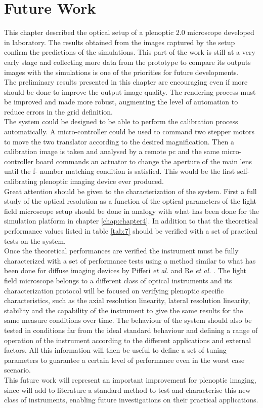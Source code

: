 \section{Future Work}
This chapter described the optical setup of a plenoptic 2.0 microscope developed in laboratory. The results obtained from the images captured by the setup confirm the predictions of the simulations. This part of the work is still at a very early stage and collecting more data from the prototype to compare its outputs images with the simulations is one of the priorities for future developments.\\
 The preliminary results presented in this chapter are encouraging even if more should be done to improve the output image quality. The rendering process must be improved and made more robust, augmenting the level of automation to reduce errors in the grid definition. 
 \\
 The system could be designed to be able to perform the calibration process automatically. A micro-controller could be used to command two stepper motors to move the two translator according to the desired magnification. Then a calibration image is taken and analysed by a remote pc and the same micro-controller board commands an actuator to change the aperture of the main lens until the f- number matching condition is satisfied. This would be the first self-calibrating plenoptic imaging device ever produced. \\
 Great attention should be given to the characterization of the system. First a full study of the optical resolution as a function of the optical parameters of the light field microscope setup should be done in analogy with what has been done for the simulation platform in chapter \ref{chap:chapter4}. In addition to that the theoretical performance values listed in table \ref{tab:7} should be verified with a set of practical tests on the system. 
\\
 Once the theoretical performances are verified the instrument must be fully characterized with a set of performance tests using a method similar to what has been done for diffuse imaging devices by Pifferi \textit{et al.} \cite{pifferi2005performance} and Re \textit{et al.} \cite{re2013multi}. The light field microscope belongs to a different class of optical instruments and its characterization protocol will be focused on verifying plenoptic specific characteristics, such as the axial resolution linearity, lateral resolution linearity, stability and the capability of the instrument to give the same results for the same measure conditions over time. The behaviour of the system should also be tested in conditions far from the ideal standard behaviour and defining a range of operation of the instrument according to the different applications and external factors. All this information will then be useful to define a set of tuning parameters to guarantee a certain level of performance even in the worst case scenario.
 \\
 This future work will represent an important improvement for plenoptic imaging, since will add to literature a standard method to test and characterise this new class of instruments, enabling future investigations on their practical applications.
 
